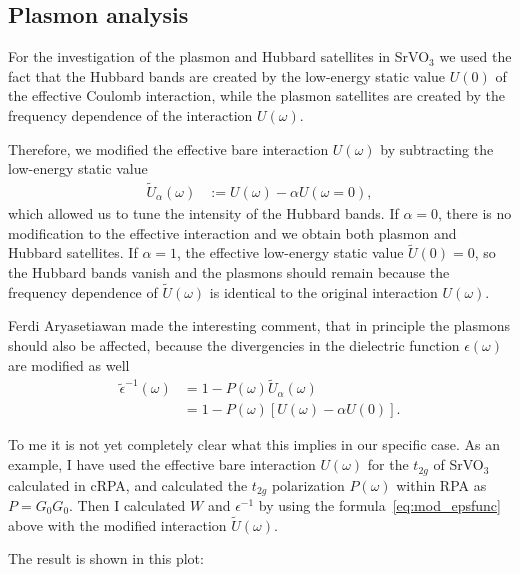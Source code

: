 \documentclass[12pt,a4paper]{scrartcl}
\numberwithin{equation}{section}
\begin{document}
\clearpage

\subsection{Plasmon analysis}

For the investigation of the plasmon and Hubbard satellites in SrVO$_3$
we used the fact that the Hubbard bands are created by the low-energy static
value $U(0)$ of the effective Coulomb interaction,
while the plasmon satellites are created by the frequency dependence
of the interaction $U(\omega)$.

Therefore, we modified the effective bare interaction $U(\omega)$
by subtracting the low-energy static value 
\begin{align}
\tilde{U}_{\alpha}(\omega) &:= U(\omega) - \alpha U(\omega=0),
\end{align}
which allowed us to tune the intensity of the Hubbard bands. If 
$\alpha=0$, there is no modification to the effective interaction
and we obtain both plasmon and Hubbard satellites.
If $\alpha=1$, the effective low-energy static
value $\tilde{U}(0)=0$, so the Hubbard bands vanish and the plasmons
should remain because the frequency dependence of $\tilde{U}(\omega)$
is identical to the original interaction $U(\omega)$.

\bigskip 

Ferdi Aryasetiawan made the interesting comment, that
in principle the plasmons should also be affected, because
the divergencies in the dielectric function $\epsilon(\omega)$
are modified as well
\begin{align}
 \tilde{\epsilon}^{-1}(\omega)
 &= 1 - P(\omega)\tilde{U}_{\alpha}(\omega) \nonumber \\
 &= 1 - P(\omega)\left[  U(\omega) - \alpha U(0) \right] . \label{eq:mod_epsfunc}
\end{align}

To me it is not yet completely clear what this implies in our specific case.
As an example, I have used the effective bare 
interaction $U(\omega)$ for the $t_{2g}$ of SrVO$_3$ calculated in cRPA, 
and calculated the $t_{2g}$ polarization $P(\omega)$ within RPA as $P=G_0G_0$.
Then I calculated $W$ and $\epsilon^{-1}$ by using the formula~\eqref{eq:mod_epsfunc} 
above with the modified interaction $\tilde{U}(\omega)$.

The result is shown in this plot:
\end{document}

